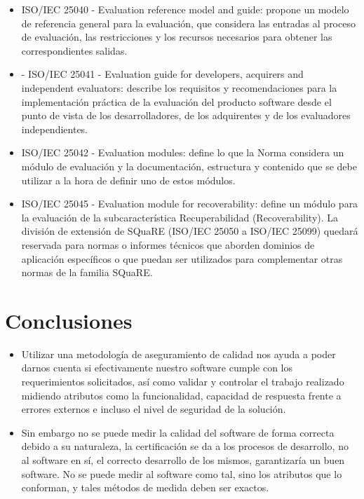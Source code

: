 \documentclass[preprint,12pt]{elsarticle}
\begin{document}
\begin{itemize}
		\begin{itemize}
			\item ISO/IEC 25040 - Evaluation reference model and guide: propone un modelo de referencia general para la evaluación, que considera las entradas al proceso de evaluación, las restricciones y los recursos necesarios para obtener las correspondientes salidas.
			\item - ISO/IEC 25041 - Evaluation guide for developers, acquirers and independent evaluators: describe los requisitos y recomendaciones para la implementación práctica de la evaluación del producto software desde el punto de vista de los desarrolladores, de los adquirentes y de los evaluadores independientes.
			\item ISO/IEC 25042 - Evaluation modules: define lo que la Norma considera un módulo de evaluación y la documentación, estructura y contenido que se debe utilizar a la hora de definir uno de estos módulos.
			\item ISO/IEC 25045 - Evaluation module for recoverability: define un módulo para la evaluación de la subcaracterística Recuperabilidad (Recoverability). La división de extensión de SQuaRE (ISO/IEC 25050 a ISO/IEC 25099) quedará reservada para normas o informes técnicos que aborden dominios de aplicación específicos o que puedan ser utilizados para complementar otras normas de la familia SQuaRE.
		\end{itemize}

		


	\end{itemize}

\section{Conclusiones}
	\begin{itemize}
\item Utilizar una metodología de aseguramiento de calidad nos ayuda a poder darnos cuenta si efectivamente nuestro software cumple con los requerimientos solicitados, así como validar y controlar el trabajo realizado midiendo atributos como la funcionalidad, capacidad de respuesta frente a errores externos e incluso el nivel de seguridad de la solución.
\item Sin embargo no se puede medir la calidad del software de forma correcta debido a su naturaleza, la certificación se da a los procesos de desarrollo, no al software en sí, el correcto desarrollo de los mismos, garantizaría un buen software. No se puede medir al software como tal, sino los atributos que lo conforman, y tales métodos de medida deben ser exactos.
	\end{itemize}



	\newpage
	
		
\end{document}
